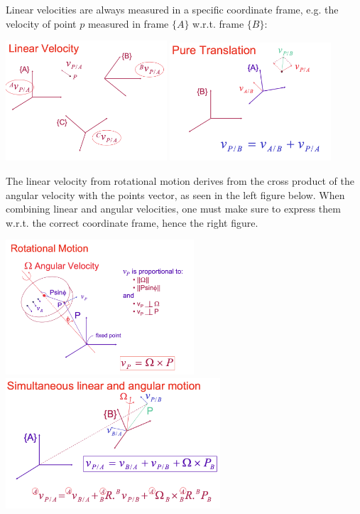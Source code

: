 Linear velocities are always measured in a specific coordinate frame, e.g. the velocity of point $p$ measured in frame $\{A\}$ w.r.t. frame $\{B\}$:

\begin{center}
	\includegraphics[width=6cm]{sections/imgs/4_linear_velocity.png}
	\includegraphics[width=6cm]{sections/imgs/4_pure_translation.png}
\end{center}

The linear velocity from rotational motion derives from the cross product of the angular velocity with the points vector, as seen in the left figure below. When combining linear and angular velocities, one must make sure to express them w.r.t. the correct coordinate frame, hence the right figure.

\begin{center}
	\includegraphics[width=7cm]{sections/imgs/4_rotational_motion.png}
	\includegraphics[width=8cm]{sections/imgs/4_sim_lin_and_angular_motion.png}
\end{center}

